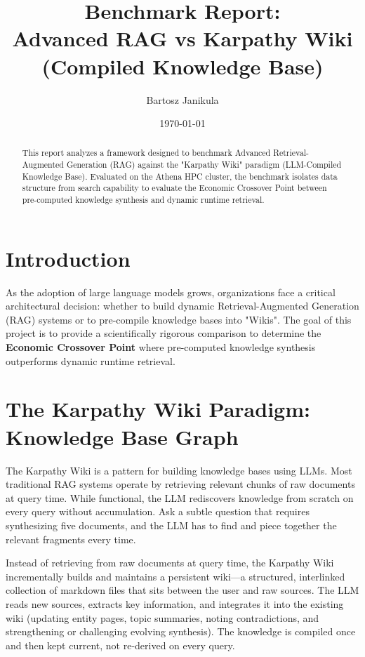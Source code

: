 \documentclass[12pt]{article}
\title{Benchmark Report: \\ Advanced RAG vs Karpathy Wiki (Compiled Knowledge Base)}
\author{Bartosz Janikula}
\date{\today}
\begin{document}
\maketitle

\begin{abstract}
This report analyzes a framework designed to benchmark Advanced Retrieval-Augmented Generation (RAG) against the "Karpathy Wiki" paradigm (LLM-Compiled Knowledge Base). Evaluated on the Athena HPC cluster, the benchmark isolates data structure from search capability to evaluate the Economic Crossover Point between pre-computed knowledge synthesis and dynamic runtime retrieval.
\end{abstract}

\section{Introduction}
As the adoption of large language models grows, organizations face a critical architectural decision: whether to build dynamic Retrieval-Augmented Generation (RAG) systems or to pre-compile knowledge bases into "Wikis". The goal of this project is to provide a scientifically rigorous comparison to determine the \textbf{Economic Crossover Point} where pre-computed knowledge synthesis outperforms dynamic runtime retrieval.

\section{The Karpathy Wiki Paradigm: Knowledge Base Graph}
The Karpathy Wiki is a pattern for building knowledge bases using LLMs. Most traditional RAG systems operate by retrieving relevant chunks of raw documents at query time. While functional, the LLM rediscovers knowledge from scratch on every query without accumulation. Ask a subtle question that requires synthesizing five documents, and the LLM has to find and piece together the relevant fragments every time.

Instead of retrieving from raw documents at query time, the Karpathy Wiki incrementally builds and maintains a persistent wiki---a structured, interlinked collection of markdown files that sits between the user and raw sources. The LLM reads new sources, extracts key information, and integrates it into the existing wiki (updating entity pages, topic summaries, noting contradictions, and strengthening or challenging evolving synthesis). The knowledge is compiled once and then kept current, not re-derived on every query.
\end{document}
